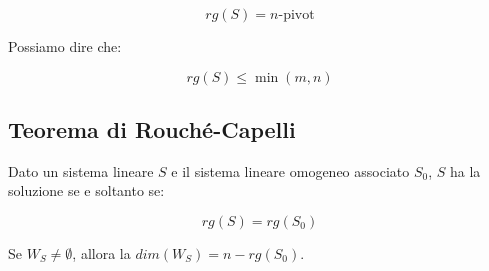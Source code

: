 \documentclass{article}
\begin{document}
$$
rg(S) = n\text{-pivot}
$$

\noindent
Possiamo dire che:

$$
rg(S) \leq \min(m, n)
$$

\subsection{Teorema di Rouché-Capelli}

Dato un sistema lineare $S$ e il sistema lineare omogeneo associato $S_0$, $S$ ha la soluzione se e soltanto se:

$$
rg(S) = rg(S_0)
$$

\noindent
Se $W_S \neq \emptyset$, allora la $dim(W_S) = n - rg(S_0)$.
\end{document}
